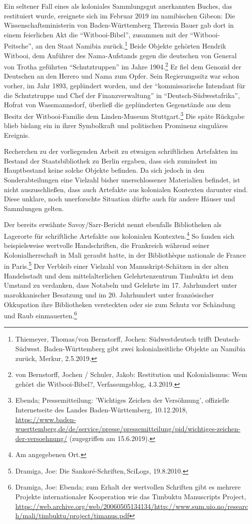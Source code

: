 \documentclass[a4paper,
fontsize=11pt,
oneside,
numbers=noperiodatend,
parskip=half-,
bibliography=totoc,
final
]{scrartcl}
\begin{document}
Ein seltener Fall eines als koloniales Sammlungsgut anerkannten Buches,
das restituiert wurde, ereignete sich im Februar 2019 im namibischen
Gibeon: Die Wissenschaftsministerin von Baden-Württemberg Theresia Bauer
gab dort in einem feierlichen Akt die \enquote{Witbooi-Bibel}, zusammen
mit der \enquote{Witbooi-Peitsche}, an den Staat Namibia
zurück.\footnote{Thiemeyer, Thomas/von Bernstorff, Jochen:
  Südwestdeutsch trifft Deutsch-Südwest. Baden-Württemberg gibt zwei
  kolonialzeitliche Objekte an Namibia zurück, Merkur, 2.5.2019.} Beide
Objekte gehörten Hendrik Witbooi, dem Anführer des Nama-Aufstands gegen
die deutschen von General von Trotha geführten \enquote{Schutztruppen}
im Jahre 1904.\footnote{von Bernstorff, Jochen / Schuler, Jakob:
  Restitution und Kolonialismus: Wem gehört die Witbooi-Bibel?,
  Verfassungsblog, 4.3.2019.} Er fiel dem Genozid der Deutschen an den
Herero und Nama zum Opfer. Sein Regierungssitz war schon vorher, im Jahr
1893, geplündert worden, und der \enquote{kommissarische Intendant für
die Schutztruppe und Chef der Finanzverwaltung} in
\enquote{Deutsch-Südwestafrika}, Hofrat von Wassmannsdorf, überließ die
geplünderten Gegenstände aus dem Besitz der Witbooi-Familie dem
Linden-Museum Stuttgart.\footnote{Ebenda; Pressemitteilung: 'Wichtiges
  Zeichen der Versöhnung', offizielle Internetseite des Landes
  Baden-Württemberg, 10.12.2018,
  \url{https://www.baden-wuerttemberg.de/de/service/presse/pressemitteilung/pid/wichtiges-zeichen-der-versoehnung/}
  (zugegriffen am 15.6.2019).} Die späte Rückgabe blieb bislang ein in
ihrer Symbolkraft und politischen Prominenz singuläres Ereignis.

Recherchen zu der vorliegenden Arbeit zu etwaigen schriftlichen
Artefakten im Bestand der Staatsbibliothek zu Berlin ergaben, dass sich
zumindest im Hauptbestand keine solche Objekte befinden. Da sich jedoch
in den Sonderabteilungen eine Vielzahl bisher unerschlossener
Materialien befindet, ist nicht auszuschließen, dass auch Artefakte aus
kolonialen Kontexten darunter sind. Diese unklare, noch unerforschte
Situation dürfte auch für andere Häuser und Sammlungen gelten.

Der bereits erwähnte Savoy/Sarr-Bericht nennt ebenfalls Bibliotheken als
Lagerorte für schriftliche Artefakte aus kolonialen
Kontexten.\footnote{Am angegebenen Ort.} So fanden sich beispielsweise
wertvolle Handschriften, die Frankreich während seiner
Kolonialherrschaft in Mali geraubt hatte, in der Bibliothèque nationale
de France in Paris.\footnote{Dramiga, Joe: Die
  Sankoré-Schriften,\,SciLogs, 19.8.2010.} Der Verbleib einer Vielzahl
von Manuskript-Schätzen in der alten Handelsstadt und dem
mittelalterlichen Gelehrtenzentrum Timbuktu ist dem Umstand zu
verdanken, dass Notabeln und Gelehrte im 17. Jahrhundert unter
marokkanischer Besatzung und im 20. Jahrhundert unter französischer
Okkupation ihre Bibliotheken versteckten oder sie zum Schutz vor
Schändung und Raub einmauerten.\footnote{Dramiga, Joe: Ebenda; zum
  Erhalt der wertvollen Schriften gibt es mehrere Projekte
  internationaler Kooperation wie das Timbuktu Manuscripts Project,
  \url{https://web.archive.org/web/20060505134134/http://www.sum.uio.no/research/mali/timbuktu/project/timanus.pdf}}
\end{document}
